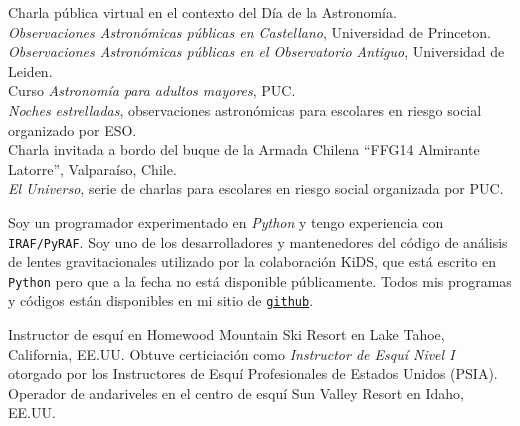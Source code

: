 \documentclass[11pt]{article}
\begin{document}

\noindent
{} Charla pública virtual en el contexto del Día de la 
Astronomía.\\
 \emph{Observaciones Astronómicas públicas
en Castellano}, Universidad de Princeton.\\
 \emph{Observaciones Astronómicas públicas
en el Observatorio Antiguo}, Universidad de Leiden.\\
 Curso \emph{Astronomía para adultos mayores}, PUC.\\
 \emph{Noches estrelladas}, observaciones astronómicas para 
escolares en riesgo social organizado por ESO.\\
 Charla invitada a bordo del buque de la Armada Chilena ``FFG14 
Almirante Latorre'', Valpara\'iso, Chile.\\
 \emph{El Universo}, serie de charlas para escolares en riesgo 
social organizada por PUC.\\



Soy un programador experimentado en \textit{Python} y tengo experiencia con 
\texttt{IRAF/PyRAF}. Soy uno de los desarrolladores y mantenedores del código de 
análisis de lentes gravitacionales utilizado por la colaboración KiDS, que está 
escrito en \texttt{Python} pero que a la fecha no está disponible públicamente. 
Todos mis programas y códigos están disponibles en mi sitio de 
\href{https://github.com/cristobal-sifon}{\texttt{github}}.\\


\hline



 Instructor de esquí en Homewood Mountain Ski Resort en 
Lake Tahoe, California, EE.UU. Obtuve certiciación como \emph{Instructor de 
Esquí Nivel I} otorgado por los Instructores de Esquí Profesionales de Estados 
Unidos (PSIA).\\
 Operador de andariveles en el centro de 
esquí Sun Valley Resort en Idaho, EE.UU.\\


\end{document}
